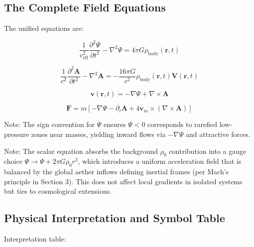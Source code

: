 \documentclass{article}
\begin{document}
\subsection{The Complete Field Equations}

The unified equations are:

\[
\boxed{\frac{1}{v_{\text{eff}}^2} \frac{\partial^2 \Psi}{\partial t^2} - \nabla^2 \Psi = 4\pi G \rho_{\text{body}}(\mathbf{r}, t)}
\]

\[
\boxed{\frac{1}{c^2} \frac{\partial^2 \mathbf{A}}{\partial t^2} - \nabla^2 \mathbf{A} = -\frac{16\pi G}{c^2} \rho_{\text{body}}(\mathbf{r}, t) \mathbf{V}(\mathbf{r}, t)}
\]

\[
\boxed{\mathbf{v}(\mathbf{r}, t) = -\nabla \Psi + \nabla \times \mathbf{A}}
\]

\[
\boxed{\mathbf{F} = m \left[ -\nabla \Psi - \partial_t \mathbf{A} + 4 \mathbf{v}_m \times (\nabla \times \mathbf{A}) \right]}
\]

Note: The sign convention for $\Psi$ ensures $\Psi < 0$ corresponds to rarefied low-pressure zones near masses, yielding inward flows via $-\nabla \Psi$ and attractive forces.

Note: The scalar equation absorbs the background $\rho_0$ contribution into a gauge choice $\Psi \to \Psi + 2\pi G \rho_0 r^2$, which introduces a uniform acceleration field that is balanced by the global aether inflows defining inertial frames (per Mach's principle in Section 3). This does not affect local gradients in isolated systems but ties to cosmological extensions.

\subsection{Physical Interpretation and Symbol Table}

Interpretation table:
\end{document}
